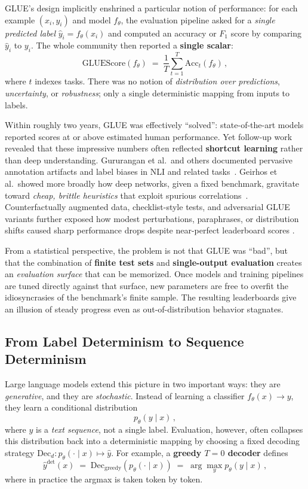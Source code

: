 GLUE's design implicitly enshrined a particular notion of performance:
for each example $(x_i, y_i)$ and model $f_\theta$, the evaluation pipeline
asked for a \emph{single predicted label} $\hat{y}_i = f_\theta(x_i)$ and
computed an accuracy or $F_1$ score by comparing $\hat{y}_i$ to $y_i$.
The whole community then reported a \textbf{single scalar}:
\[
  \text{GLUEScore}(f_\theta) \;=\; \frac{1}{T} \sum_{t=1}^T \text{Acc}_t(f_\theta)\,,
\]
where $t$ indexes tasks. There was no notion of \emph{distribution over
predictions}, \emph{uncertainty}, or \emph{robustness}; only a single
deterministic mapping from inputs to labels.

Within roughly two years, GLUE was effectively ``solved'':
state-of-the-art models reported scores at or above estimated human
performance. Yet follow-up work revealed that these impressive numbers
often reflected \textbf{shortcut learning} rather than deep understanding.
Gururangan et al.\ and others documented pervasive annotation artifacts
and label biases in NLI and related tasks~\cite{gururangan2018annotation,mccoy2019right}.
Geirhos et al.\ showed more broadly how deep networks, given a fixed benchmark,
gravitate toward \emph{cheap, brittle heuristics} that exploit spurious
correlations~\cite{geirhos2020shortcut}. Counterfactually augmented data,
checklist-style tests, and adversarial GLUE variants further exposed how
modest perturbations, paraphrases, or distribution shifts caused sharp
performance drops despite near-perfect leaderboard scores
\cite{kaushik2020learning,ribeiro2020checklist,wang2021adversarialglue,chen2021mandoline,yuan2023revisiting}.

From a statistical perspective, the problem is not that GLUE was ``bad'',
but that the combination of \textbf{finite test sets} and \textbf{single-output
evaluation} creates an \emph{evaluation surface} that can be memorized.
Once models and training pipelines are tuned directly against that surface,
new parameters are free to overfit the idiosyncrasies of the benchmark's
finite sample. The resulting leaderboards give an illusion of steady
progress even as out-of-distribution behavior stagnates.

\subsection{From Label Determinism to Sequence Determinism}
\label{subsec:sequence-determinism}

Large language models extend this picture in two important ways:
they are \emph{generative}, and they are \emph{stochastic}. Instead of
learning a classifier $f_\theta(x) \rightarrow y$, they learn a conditional
distribution
\[
  p_\theta(y \mid x)\,,
\]
where $y$ is a \emph{text sequence}, not a single label. Evaluation,
however, often collapses this distribution back into a deterministic
mapping by choosing a fixed decoding strategy
$\text{Dec}_d\colon p_\theta(\cdot \mid x) \mapsto \hat{y}$.
For example, a \textbf{greedy $T{=}0$ decoder} defines
\[
  \hat{y}^{\text{det}}(x) \;=\;
  \text{Dec}_{\text{greedy}}(p_\theta(\cdot \mid x))
  \;=\; \arg\max_{y} p_\theta(y \mid x)\,,
\]
where in practice the argmax is taken token by token.

